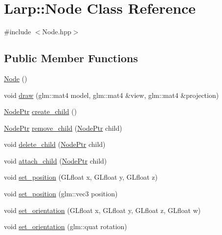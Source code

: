 \hypertarget{classLarp_1_1Node}{\section{Larp\-:\-:Node Class Reference}
\label{classLarp_1_1Node}
}


{\ttfamily \#include $<$Node.\-hpp$>$}

\subsection*{Public Member Functions}
\begin{DoxyCompactItemize}
\item 
\hyperlink{classLarp_1_1Node_a2cb8fc6e60b762b02226d73489ac5099}{Node} ()
\item 
void \hyperlink{classLarp_1_1Node_aa701cc59976ddbd1c232e027df0e4a9b}{draw} (glm\-::mat4 model, glm\-::mat4 \&view, glm\-::mat4 \&projection)
\item 
\hyperlink{namespaceLarp_a171c1dc8b70cfb441b15d7386780db23}{Node\-Ptr} \hyperlink{classLarp_1_1Node_a3ad8fa3c292ce51ce8ac0922c96608f1}{create\-\_\-child} ()
\item 
\hyperlink{namespaceLarp_a171c1dc8b70cfb441b15d7386780db23}{Node\-Ptr} \hyperlink{classLarp_1_1Node_accd1116b2d35500ae519588d07f1f30e}{remove\-\_\-child} (\hyperlink{namespaceLarp_a171c1dc8b70cfb441b15d7386780db23}{Node\-Ptr} child)
\item 
void \hyperlink{classLarp_1_1Node_a091f322ac9a2dcfcb81ab38bdff61399}{delete\-\_\-child} (\hyperlink{namespaceLarp_a171c1dc8b70cfb441b15d7386780db23}{Node\-Ptr} child)
\item 
void \hyperlink{classLarp_1_1Node_abbf90d7e84f9c8144bc5532d288ce3ae}{attach\-\_\-child} (\hyperlink{namespaceLarp_a171c1dc8b70cfb441b15d7386780db23}{Node\-Ptr} child)
\item 
void \hyperlink{classLarp_1_1Node_a44070f7bb06cdca4fafbdf65f0d6118e}{set\-\_\-position} (G\-Lfloat x, G\-Lfloat y, G\-Lfloat z)
\item 
void \hyperlink{classLarp_1_1Node_a8eef7a9829817bfe9b2ff3bed5b0c3a8}{set\-\_\-position} (glm\-::vec3 position)
\item 
void \hyperlink{classLarp_1_1Node_ad1b12b56ba7c708d1ce51ec0762f7476}{set\-\_\-orientation} (G\-Lfloat x, G\-Lfloat y, G\-Lfloat z, G\-Lfloat w)
\item 
void \hyperlink{classLarp_1_1Node_a3695bdfa48908be007d751e9c05bdb0e}{set\-\_\-orientation} (glm\-::quat rotation)
\item 

\end{DoxyCompactItemize}
